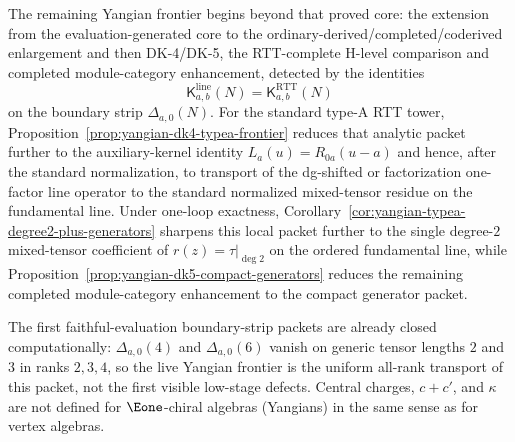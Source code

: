 The remaining Yangian frontier begins beyond that proved core: the
extension from the evaluation-generated core to the
ordinary-derived/completed/coderived enlargement and then DK-4/DK-5, the
RTT-complete H-level comparison and completed
module-category enhancement, detected by the identities
\[
\mathsf{K}^{\mathrm{line}}_{a,b}(N)
=\mathsf{K}^{\mathrm{RTT}}_{a,b}(N)
\]
on the boundary strip $\Delta_{a,0}(N)$.  For the standard type-A RTT
tower, Proposition~\ref{prop:yangian-dk4-typea-frontier} reduces that
analytic packet further to the auxiliary-kernel identity
$L_a(u)=R_{0a}(u-a)$ and hence, after the standard normalization, to
transport of the dg-shifted or factorization one-factor line operator
to the standard normalized mixed-tensor residue on the fundamental
line.  Under one-loop exactness,
Corollary~\ref{cor:yangian-typea-degree2-plus-generators} sharpens this
local packet further to the single degree-$2$ mixed-tensor coefficient
of $r(z)=\tau|_{\deg 2}$ on the ordered fundamental line, while
Proposition~\ref{prop:yangian-dk5-compact-generators} reduces the
remaining completed module-category enhancement to the compact
generator packet.

The first faithful-evaluation boundary-strip
packets are already closed computationally:
$\Delta_{a,0}(4)$ and $\Delta_{a,0}(6)$ vanish on generic tensor
lengths $2$ and $3$ in ranks $2,3,4$, so the live Yangian frontier is
the uniform all-rank transport of this packet, not the first visible
low-stage defects.
Central charges, $c{+}c'$, and $\kappa$ are not defined for
$\Eone$-chiral algebras (Yangians) in the same sense as for
vertex algebras.

